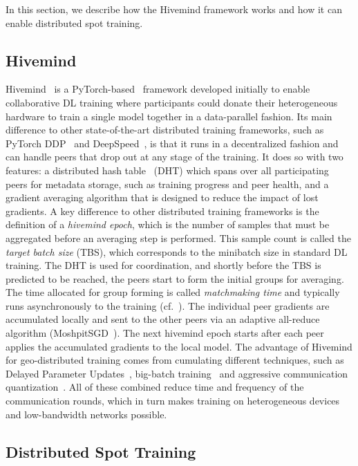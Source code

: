 In this section, we describe how the Hivemind framework works and how it can enable distributed spot training.

\subsection{Hivemind}
\label{ssec:hivemind}

Hivemind~\cite{hivemind} is a PyTorch-based~\cite{paszke2019pytorch} framework developed initially to enable collaborative DL training where participants could donate their heterogeneous hardware to train a single model together in a data-parallel fashion.
Its main difference to other state-of-the-art distributed training frameworks, such as PyTorch DDP~\cite{li2020pytorch} and DeepSpeed~\cite{rasley2020deepspeed}, is that it runs in a decentralized fashion and can handle peers that drop out at any stage of the training. 
It does so with two features: a distributed hash table~\cite{maymounkov2002kademlia} (DHT) which spans over all participating peers for metadata storage, such as training progress and peer health, and a gradient averaging algorithm that is designed to reduce the impact of lost gradients.
A key difference to other distributed training frameworks is the definition of a \textit{hivemind epoch}, which is the number of samples that must be aggregated before an averaging step is performed.
This sample count is called the \textit{target batch size} (TBS), which corresponds to the minibatch size in standard DL training.
The DHT is used for coordination, and shortly before the TBS is predicted to be reached, the peers start to form the initial groups for averaging.
The time allocated for group forming is called \textit{matchmaking time} and typically runs asynchronously to the training (cf.~).
The individual peer gradients are accumulated locally and sent to the other peers via an adaptive all-reduce algorithm (MoshpitSGD~\cite{ryabinin2021moshpit}).
The next hivemind epoch starts after each peer applies the accumulated gradients to the local model.
The advantage of Hivemind for geo-distributed training comes from cumulating different techniques, such as Delayed Parameter Updates~\cite{ren2021zerooffload}, big-batch training~\cite{you2019large} and aggressive communication quantization~\cite{dettmers20168bit}.
All of these combined reduce time and frequency of the communication rounds, which in turn makes training on heterogeneous devices and low-bandwidth networks possible.


\subsection{Distributed Spot Training}

